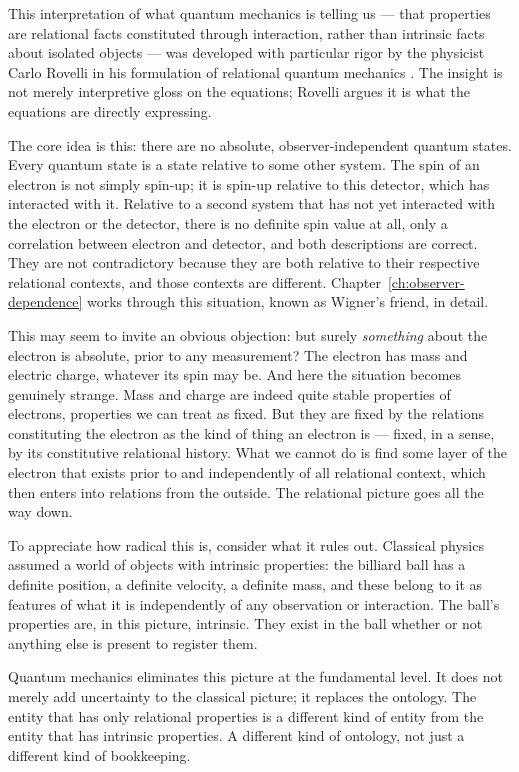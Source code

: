 This interpretation of what quantum mechanics is telling us --- that properties are relational facts constituted through interaction, rather than intrinsic facts about isolated objects --- was developed with particular rigor by the physicist Carlo Rovelli in his formulation of relational quantum mechanics \citep{Rovelli1996,Rovelli2021}. The insight is not merely interpretive gloss on the equations; Rovelli argues it is what the equations are directly expressing.

The core idea is this: there are no absolute, observer-independent quantum states. Every quantum state is a state relative to some other system. The spin of an electron is not simply spin-up; it is spin-up relative to this detector, which has interacted with it. Relative to a second system that has not yet interacted with the electron or the detector, there is no definite spin value at all, only a correlation between electron and detector, and both descriptions are correct. They are not contradictory because they are both relative to their respective relational contexts, and those contexts are different. Chapter~\ref{ch:observer-dependence} works through this situation, known as Wigner's friend, in detail.

This may seem to invite an obvious objection: but surely \emph{something} about the electron is absolute, prior to any measurement? The electron has mass and electric charge, whatever its spin may be. And here the situation becomes genuinely strange. Mass and charge are indeed quite stable properties of electrons, properties we can treat as fixed. But they are fixed by the relations constituting the electron as the kind of thing an electron is --- fixed, in a sense, by its constitutive relational history. What we cannot do is find some layer of the electron that exists prior to and independently of all relational context, which then enters into relations from the outside. The relational picture goes all the way down.

To appreciate how radical this is, consider what it rules out. Classical physics assumed a world of objects with intrinsic properties: the billiard ball has a definite position, a definite velocity, a definite mass, and these belong to it as features of what it is independently of any observation or interaction. The ball's properties are, in this picture, intrinsic. They exist in the ball whether or not anything else is present to register them.

Quantum mechanics eliminates this picture at the fundamental level. It does not merely add uncertainty to the classical picture; it replaces the ontology. The entity that has only relational properties is a different kind of entity from the entity that has intrinsic properties. A different kind of ontology, not just a different kind of bookkeeping.

